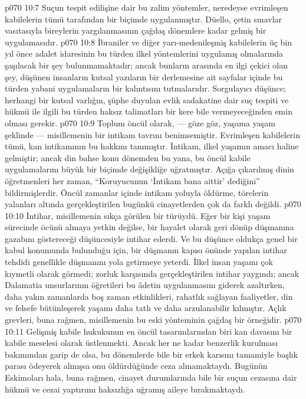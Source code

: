 \vs p070 10:7 Suçun tespit edilişine dair bu zalim yöntemler, neredeyse evrimleşen kabilelerin tümü tarafından bir biçimde uygulanmıştır. Düello, çetin sınavlar vasıtasıyla bireylerin yargılanmasının çağdaş dönemlere kadar gelmiş bir uygulamasıdır.
\vs p070 10:8 İbraniler ve diğer yarı\hyp{}medenileşmiş kabilelerin üç bin yıl önce adalet idaresinin bu türden ilkel yöntemlerini uygulamış olmalarında şaşılacak bir şey bulunmamaktadır; ancak bunların arasında en ilgi çekici olan şey, düşünen insanların kutsal yazıların bir derlemesine ait sayfalar içinde bu türden yabani uygulamaların bir kalıntısını tutmalarıdır. Sorgulayıcı düşünce; herhangi bir kutsal varlığın, şüphe duyulan evlik sadakatine dair suç tespiti ve hükmü ile ilgili bu türden haksız talimatları bir kere bile vermeyeceğinden emin olması gerekir.
\vs p070 10:9 Toplum öncül olarak, --- göze göz, yaşama yaşam şeklinde --- misillemenin bir intikam tavrını benimsemiştir. Evrimleşen kabilelerin tümü, kan intikamının bu hakkını tanımıştır. İntikam, ilkel yaşamın amacı haline gelmiştir; ancak din bahse konu dönemden bu yana, bu öncül kabile uygulamalarını büyük bir biçimde değişikliğe uğratmıştır. Açığa çıkarılmış dinin öğretmenleri her zaman, “Koruyucunun ‘İntikam bana aittir’ dediğini” bildirmişlerdir. Öncül zamanlar içinde intikam yoluyla öldürme, törelerin yalanları altında gerçekleştirilen bugünkü cinayetlerden çok da farklı değildi.
\vs p070 10:10 İntihar, misillemenin sıkça görülen bir türüydü. Eğer bir kişi yaşam sürecinde öcünü almaya yetkin değilse, bir hayalet olarak geri dönüp düşmanına gazabını göstereceği düşüncesiyle intihar ederdi. Ve bu düşünce oldukça genel bir kabul konumunda bulunduğu için, bir düşmanın kapısı önünde yapılan intihar tehdidi genellikle düşmanını yola getirmeye yeterdi. İlkel insan yaşamı çok kıymetli olarak görmedi; zorluk karşısında gerçekleştirilen intihar yaygındı; ancak Dalamatia unsurlarının öğretileri bu âdetin uygulanmasını giderek azaltırken, daha yakın zamanlarda boş zaman etkinlikleri, rahatlık sağlayan faaliyetler, din ve felsefe bütünleşerek yaşamı daha tatlı ve daha arzulanabilir kılmıştır. Açlık grevleri, buna rağmen, misillemenin bu eski yönteminin çağdaş bir örneğidir.
\vs p070 10:11 Gelişmiş kabile hukukunun en öncül tasarımlarından biri kan davasını bir kabile meselesi olarak üstlenmekti. Ancak her ne kadar benzerlik kurulması bakımından garip de olsa, bu dönemlerde bile bir erkek karısını tamamiyle başlık parası ödeyerek almışsa onu öldürdüğünde ceza almamaktaydı. Bugünün Eskimoları hala, buna rağmen, cinayet durumlarında bile bir suçun cezasına dair hükmü ve cezai yaptırımı haksızlığa uğramış aileye bırakmaktaydı.
